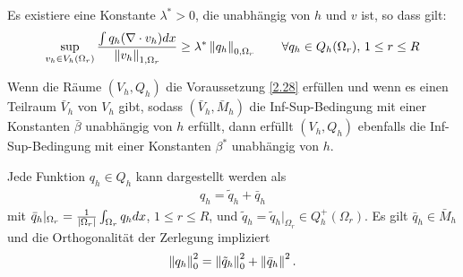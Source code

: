 \begin{voraussetzung}\label{2.28}
  Es existiere eine Konstante $\lambda^{*} > 0$, die unabhängig von $h$ und $v$ ist, so dass gilt:
  \begin{align*}
    \sup_{v_{h}\in V_{h}(\Omega_{r})} \frac{\int q_{h} (\nabla\cdot v_{h}) dx}{ \left \|v_{h} \right\|_{1, \Omega_{r}}} \geq \lambda^{*} \left \|q_{h} \right\|_{0, \Omega_{r}}\qquad \forall q_{h} \in Q_{h}(\Omega_{r}), \, 1 \leq r\leq R
  \end{align*}
\end{voraussetzung}
\begin{satz}
  Wenn die Räume $(V_{h}, Q_{h})$ die Voraussetzung \ref{2.28} erfüllen und wenn es einen Teilraum $\bar V_{h}$ von $V_{h}$ gibt, sodass $(\bar V_{h}, \bar M_{h})$ die Inf-Sup-Bedingung mit einer Konstanten $\bar \beta$ unabhängig von $h$ erfüllt, dann erfüllt $(V_{h}, Q_{h})$ ebenfalls die Inf-Sup-Bedingung mit einer Konstanten $\beta^{*}$ unabhängig von $h$. 
\end{satz}
\begin{beweis}
  Jede Funktion $q_{h} \in Q_{h}$ kann dargestellt werden als 
  \begin{align*}
    q_{h} = \tilde q_{h} + \bar q_{h}
  \end{align*}
mit $\bar q_{h}|_{\Omega_{r}} = \frac 1 {\left|\Omega_{r}\right|} \int_{\Omega_{r}} q_{h} dx$, $1 \leq r\leq R$, und $\tilde q_{h} = \tilde q_{h}|_{\Omega_{r}} \in Q_{h}^{+}(\Omega_{r})$. Es gilt $\bar q_{h} \in \bar M_{h}$ und die Orthogonalität der Zerlegung impliziert
\begin{align*}
  \left \|q_{h} \right\|_{0}^{2} = \left \|\tilde q_{h} \right\|_{0}^{2} + \left \|\bar q_{h} \right\|^{2}. 
\end{align*}

\end{beweis}


